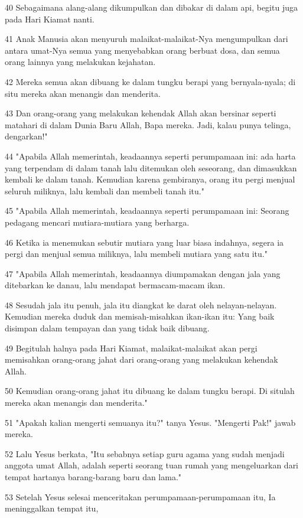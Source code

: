 \par 40 Sebagaimana alang-alang dikumpulkan dan dibakar di dalam api, begitu juga pada Hari Kiamat nanti.
\par 41 Anak Manusia akan menyuruh malaikat-malaikat-Nya mengumpulkan dari antara umat-Nya semua yang menyebabkan orang berbuat dosa, dan semua orang lainnya yang melakukan kejahatan.
\par 42 Mereka semua akan dibuang ke dalam tungku berapi yang bernyala-nyala; di situ mereka akan menangis dan menderita.
\par 43 Dan orang-orang yang melakukan kehendak Allah akan bersinar seperti matahari di dalam Dunia Baru Allah, Bapa mereka. Jadi, kalau punya telinga, dengarkan!"
\par 44 "Apabila Allah memerintah, keadaannya seperti perumpamaan ini: ada harta yang terpendam di dalam tanah lalu ditemukan oleh seseorang, dan dimasukkan kembali ke dalam tanah. Kemudian karena gembiranya, orang itu pergi menjual seluruh miliknya, lalu kembali dan membeli tanah itu."
\par 45 "Apabila Allah memerintah, keadaannya seperti perumpamaan ini: Seorang pedagang mencari mutiara-mutiara yang berharga.
\par 46 Ketika ia menemukan sebutir mutiara yang luar biasa indahnya, segera ia pergi dan menjual semua miliknya, lalu membeli mutiara yang satu itu."
\par 47 "Apabila Allah memerintah, keadaannya diumpamakan dengan jala yang ditebarkan ke danau, lalu mendapat bermacam-macam ikan.
\par 48 Sesudah jala itu penuh, jala itu diangkat ke darat oleh nelayan-nelayan. Kemudian mereka duduk dan memisah-misahkan ikan-ikan itu: Yang baik disimpan dalam tempayan dan yang tidak baik dibuang.
\par 49 Begitulah halnya pada Hari Kiamat, malaikat-malaikat akan pergi memisahkan orang-orang jahat dari orang-orang yang melakukan kehendak Allah.
\par 50 Kemudian orang-orang jahat itu dibuang ke dalam tungku berapi. Di situlah mereka akan menangis dan menderita."
\par 51 "Apakah kalian mengerti semuanya itu?" tanya Yesus. "Mengerti Pak!" jawab mereka.
\par 52 Lalu Yesus berkata, "Itu sebabnya setiap guru agama yang sudah menjadi anggota umat Allah, adalah seperti seorang tuan rumah yang mengeluarkan dari tempat hartanya barang-barang baru dan lama."
\par 53 Setelah Yesus selesai menceritakan perumpamaan-perumpamaan itu, Ia meninggalkan tempat itu,

